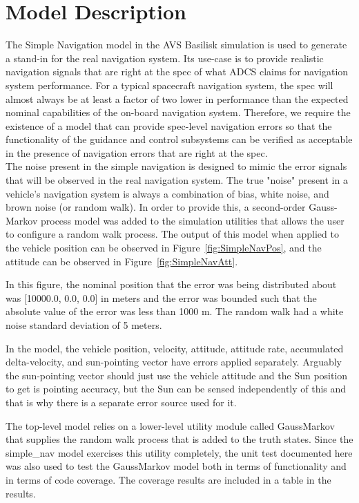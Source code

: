 \section{Model Description}

The Simple Navigation model in the AVS Basilisk simulation is used to generate 
a stand-in for the real navigation system.  Its use-case is to provide realistic 
navigation signals that are right at the spec of what ADCS claims for navigation 
system performance.  For a typical spacecraft navigation system, the spec will 
almost always be at least a factor of two lower in performance than the expected 
nominal capabilities of the on-board navigation system.  Therefore, we require 
the existence of a model that can provide spec-level navigation errors so that 
the functionality of the guidance and control subsystems can be verified as 
acceptable in the presence of navigation errors that are right at the spec. \\

The noise present in the simple navigation is designed to mimic the error signals 
that will be observed in the real navigation system.  The true "noise" present 
in a vehicle's navigation system is always a combination of bias, white noise, 
and brown noise (or random walk).  In order to provide this, a second-order 
Gauss-Markov process model was added to the simulation utilities that allows 
the user to configure a random walk process.  The output of this model when 
applied to the vehicle position can be observed in Figure~\ref{fig:SimpleNavPos}, 
and the attitude can be observed in Figure~\ref{fig:SimpleNavAtt}.




In this figure, the nominal position that the error was being distributed about
 was [10000.0, 0.0, 0.0] in meters and the error was bounded such that the 
absolute value of the error was less than 1000 m.  The random walk had a white 
noise standard deviation of 5 meters.

In the model, the vehicle position, velocity, attitude, attitude rate, 
accumulated delta-velocity, and sun-pointing vector have errors applied 
separately.  Arguably the sun-pointing vector should just use the vehicle 
attitude and the Sun position to get is pointing accuracy, but the Sun can be 
sensed independently of this and that is why there is a separate error source
used for it.

The top-level model relies on a lower-level utility module called GaussMarkov 
that supplies the random walk process that is added to the truth states.  
Since the simple\_nav model exercises this utility completely, the unit test 
documented here was also used to test the GaussMarkov model both in terms of 
functionality and in terms of code coverage.  The coverage results are included 
in a table in the results.